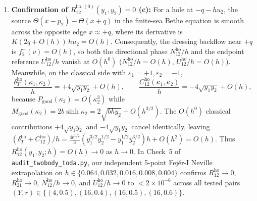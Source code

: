 \documentclass[11pt,a4paper]{article}
\newcommand{\ee}{\mathrm{e}}
\begin{document}
\begin{enumerate}[leftmargin=2em]
  \item \textbf{Confirmation of $R_{12}^{\mathrm{ho},(0)}(y_1,y_2)=0$ (c):}
  For a hole at $-q-h u_2$, the source $\Theta(x-p_2)-\Theta(x+q)$ in the finite-sea Bethe equation is smooth across the opposite edge $x\approx +q$, where its derivative is $K(2q+O(h))\,h u_2 = O(h)$. Consequently, the dressing backflow near $+q$ is $f_2^+(v)=O(h)$, so both the directional phase $N_{12}^{\mathrm{ho}}/h$ and the endpoint reference $U_{12}^{\mathrm{ho}}/h$ vanish at $O(h^0)$ ($N_{12}^{\mathrm{ho}}/h=O(h)$, $U_{12}^{\mathrm{ho}}/h=O(h)$). Meanwhile, on the classical side with $\varepsilon_1=+1, \varepsilon_2=-1$,
  \[
    \frac{\delta_T^{\mathrm{ho}}(\kappa_1,\kappa_2)}{h} = +4\sqrt{y_1 y_2} + O(h), \qquad \frac{C_{12}^{\mathrm{ho}}(\kappa_1,\kappa_2)}{h} = -4\sqrt{y_1 y_2} + O(h),
  \]
  because $P_{\mathrm{good}}(\kappa_2)=O(\kappa_2^3)$ while $M_{\mathrm{good}}(\kappa_2)=2b\sinh\kappa_2=2\sqrt{b h y_2}+O(h^{3/2})$. The $O(h^0)$ classical contributions $+4\sqrt{y_1 y_2}$ and $-4\sqrt{y_1 y_2}$ cancel identically, leaving $(\delta_T^{\mathrm{ho}}+C_{12}^{\mathrm{ho}})/h = \frac{4\ee^{1/2}}{3}(y_1^{3/2}y_2^{1/2}-y_1^{1/2}y_2^{3/2})h + O(h^2) = O(h)$. Thus $R_{12}^{\mathrm{ho}}(y_1,y_2;h)=O(h)\to 0$ as $h\to 0$. In Check~5 of \texttt{audit\_twobody\_toda.py}, our independent 5-point Fej\'er-I Neville extrapolation on $h\in\{0.064,0.032,0.016,0.008,0.004\}$ confirms $R_{12}^{\mathrm{ho}}\to 0$, $R_{21}^{\mathrm{ho}}\to 0$, $N_{12}^{\mathrm{ho}}/h\to 0$, and $U_{12}^{\mathrm{ho}}/h\to 0$ to $<2\times 10^{-6}$ across all tested pairs $(Y,r)\in\{(4,0.5),(16,0.4),(16,0.5),(16,0.6)\}$.


\end{enumerate}
\end{document}
